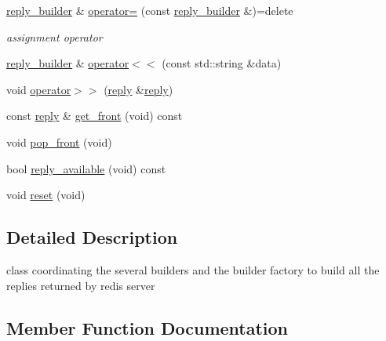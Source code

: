 \begin{DoxyCompactItemize}
\mbox{\label{classcpp__redis_1_1builders_1_1reply__builder_a445ca388e241fe95b522890fee8c14ca}} 
\hyperlink{classcpp__redis_1_1builders_1_1reply__builder}{reply\+\_\+builder} \& \hyperlink{classcpp__redis_1_1builders_1_1reply__builder_a445ca388e241fe95b522890fee8c14ca}{operator=} (const \hyperlink{classcpp__redis_1_1builders_1_1reply__builder}{reply\+\_\+builder} \&)=delete
\begin{DoxyCompactList}\small\item\em assignment operator \end{DoxyCompactList}\item 
\hyperlink{classcpp__redis_1_1builders_1_1reply__builder}{reply\+\_\+builder} \& \hyperlink{classcpp__redis_1_1builders_1_1reply__builder_a5f675e309a7a6002d582293c6410c967}{operator$<$$<$} (const std\+::string \&data)
\item 
void \hyperlink{classcpp__redis_1_1builders_1_1reply__builder_a71c0c93754b0bffb9c84c86ac3096bc4}{operator$>$$>$} (\hyperlink{classcpp__redis_1_1reply}{reply} \&\hyperlink{classcpp__redis_1_1reply}{reply})
\item 
const \hyperlink{classcpp__redis_1_1reply}{reply} \& \hyperlink{classcpp__redis_1_1builders_1_1reply__builder_ac37b532920ace20e24a40ea1c61940fe}{get\+\_\+front} (void) const
\item 
void \hyperlink{classcpp__redis_1_1builders_1_1reply__builder_a0b5fb8dd4fc87c508e0a45647bc86b16}{pop\+\_\+front} (void)
\item 
bool \hyperlink{classcpp__redis_1_1builders_1_1reply__builder_af7d8e764ab591390cd1eae8801cd691c}{reply\+\_\+available} (void) const
\item 
void \hyperlink{classcpp__redis_1_1builders_1_1reply__builder_a9dc120d8bdbe8992bb113f029a825c45}{reset} (void)
\end{DoxyCompactItemize}


\subsection{Detailed Description}
class coordinating the several builders and the builder factory to build all the replies returned by redis server 

\subsection{Member Function Documentation}
\mbox{\label{classcpp__redis_1_1builders_1_1reply__builder_ac37b532920ace20e24a40ea1c61940fe}} 
